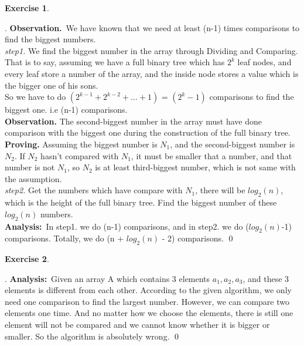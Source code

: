\documentclass[12pt, notitlepage]{article}
\newtheorem{ex}{Exercise}
\newenvironment{sol}
  {\par\vspace{3mm}\noindent{\it Solution}.}{\qed}
\begin{document}
\begin{ex}\end{ex}
\begin{sol}
\textbf{Observation.}~We have known that we need at least (n-1) times comparisons to find the biggest numbers.\\

\emph{step1.} We find the biggest number in the array through Dividing and Comparing. That is to say, assuming we have a full binary tree which has $2^k$ leaf nodes, and every leaf store a number of the array, and the inside node stores a value which is the bigger one of his sons.\\
So we have to do $(2^{k-1}+2^{k-2}+...+1)$ = $(2^k-1)$ comparisons to find the biggest one. i.e (n-1) comparisons.\\

\textbf{Observation.} The second-biggest number in the array must have done comparison with the biggest one during the construction of the full binary tree.\\
\textbf{Proving.} Assuming the biggest number is $N_1$, and the second-biggest number is $N_2$. If $N_2$ hasn't compared with $N_1$, it must be smaller that a number, and that number is not $N_1$, so $N_2$ is at least third-biggest number, which is not same with the assumption.\\

\emph{step2.} Get the numbers which have compare with $N_1$, there will be $log_2(n)$, which is the height of the full binary tree. Find the biggest number of these $log_2(n)$ numbers.\\

\textbf{Analysis:}~In step1. we do (n-1) comparisons, and in step2. we do ($log_2(n)$-1) comparisons. Totally, we do (n + $log_2(n)$ - 2) comparisons.
\end{sol}


\begin{ex}\end{ex}
\begin{sol}
\textbf{Analysis:}~Given an array A which contains 3 elements $a_1,a_2,a_3$, and these 3 elements is different from each other. According to the given algorithm, we only need one comparison to find the largest number. However, we can compare two elements one time. And no matter how we choose the elements, there is still one element will not be compared and we cannot know whether it is bigger or smaller. So the algorithm is absolutely wrong.
\end{sol}
\end{document}
